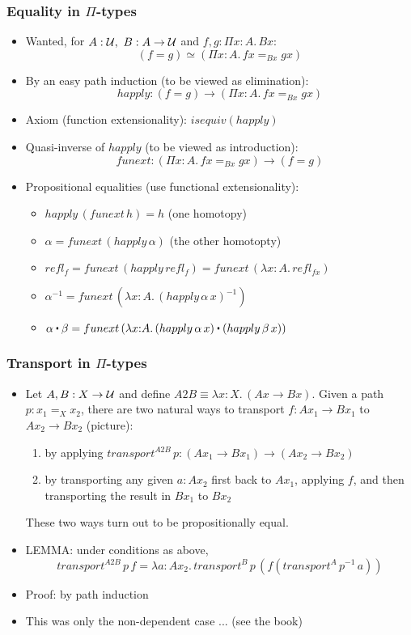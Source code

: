 \documentclass[handout]{beamer}
\newcommand{\depi}[3]{\Pi{#1{:}#2.\,#3}}
\newcommand{\lamt}[3]{\lambda{#1{:}#2.\,#3}}
\newcommand{\UU}{{\cal U}}
\newcommand{\ct}{%
  \mathchoice{\mathbin{\raisebox{0.5ex}{$\displaystyle\centerdot$}}}%
             {\mathbin{\raisebox{0.5ex}{$\centerdot$}}}%
             {\mathbin{\raisebox{0.25ex}{$\scriptstyle\,\centerdot\,$}}}%
             {\mathbin{\raisebox{0.1ex}{$\scriptscriptstyle\,\centerdot\,$}}}
}
\newcommand{\opp}[1]{\mathord{{#1}^{-1}}}
\begin{document}
 \frame
  {

    \frametitle{Equality in $\Pi$-types}

    \begin{itemize}[<+->]
    \item Wanted, for $A:\UU,~B:A\to\UU$ and $f,g:\depi{x}{A}{Bx}$: 
    $$(f=g) \simeq (\depi{x}{A}{fx = _{Bx} gx})$$
    \item By an easy path induction (to be viewed as elimination):
    $$happly: (f=g) \to (\depi{x}{A}{fx = _{Bx} gx})$$
    \item Axiom (function extensionality): $isequiv(happly)$
    \item Quasi-inverse of $happly$ (to be viewed as introduction):
    $$funext: (\depi{x}{A}{fx = _{Bx} gx}) \to (f=g)$$
    \item Propositional equalities (use functional extensionality):
      \begin{itemize}[<+->]
      \item $happly\,(funext\,h) = h$ (one homotopy)
      \item $\alpha = funext\,(happly\,\alpha)$ (the other homotopty)
      \item $refl_f = funext\,(happly\,refl_f ) = funext\,(\lamt{x}{A}{refl_{fx}})$
      \item $\opp \alpha = funext\,(\lamt{x}{A}{\opp{(happly\,\alpha\,x)}})$
      \item $\alpha\ct\beta = funext\,(\lamt{x}{A}{(happly\,\alpha\,x)\ct(happly\,\beta\,x)})$
      \end{itemize}
    \end{itemize}
  }

 \frame
  {

    \frametitle{Transport in $\Pi$-types}

    \begin{itemize}[<+->]
    \item Let $A,B:X\to\UU$ and define $A2B\equiv\lamt{x}{X}{(Ax\to Bx)}$.
          Given a path $p:x_1 =_X x_2$, there are two natural ways to transport
          $f: Ax_1 \to Bx_1$ to $Ax_2 \to Bx_2$ (picture):
      \begin{enumerate}[<+->]
      \item by applying $transport^{A2B}\,p : (Ax_1 \to Bx_1)\to(Ax_2 \to Bx_2)$
      \item by transporting any given $a:Ax_2$ first back to $Ax_1$, applying $f$, 
            and then transporting the result in $Bx_1$ to $Bx_2$
      \end{enumerate}
          These two ways turn out to be propositionally equal.
    \item LEMMA: under conditions as above,
    $$transport^{A2B}\,p\,f = \lamt{a}{Ax_2}{transport^B\,p\,(f(transport^A\,\opp p\,a))}$$
    \item Proof: by path induction
    \item This was only the non-dependent case ... (see the book) 
    \end{itemize}
  }
\end{document}
